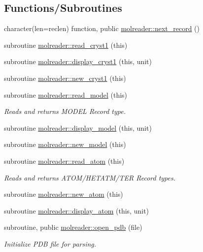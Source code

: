 \subsection*{Functions/\+Subroutines}
\begin{DoxyCompactItemize}
\item 
character(len=reclen) function, public \hyperlink{namespacemolreader_af6c857ef51f99971a66b1c293d24906b}{molreader\+::next\+\_\+record} ()
\item 
subroutine \hyperlink{namespacemolreader_af85c1b386f0dc78ebf55e003b4f8c83a}{molreader\+::read\+\_\+cryst1} (this)
\item 
subroutine \hyperlink{namespacemolreader_ac9a2b0ff287faa780311cc432b866610}{molreader\+::display\+\_\+cryst1} (this, unit)
\item 
subroutine \hyperlink{namespacemolreader_ac284dc33f40874d6156c1cd36781002c}{molreader\+::new\+\_\+cryst1} (this)
\item 
subroutine \hyperlink{namespacemolreader_a64ff990dc05c01debc1138dd012f4bcb}{molreader\+::read\+\_\+model} (this)
\begin{DoxyCompactList}\small\item\em Reads and returns M\+O\+D\+EL Record type. \end{DoxyCompactList}\item 
subroutine \hyperlink{namespacemolreader_a462d061944b74f7145b8bf89fc3439fc}{molreader\+::display\+\_\+model} (this, unit)
\item 
subroutine \hyperlink{namespacemolreader_a8edb660b2e1b64a5d78593c734afbe95}{molreader\+::new\+\_\+model} (this)
\item 
subroutine \hyperlink{namespacemolreader_a49ccaf345b633e27f69ad7a5a8637a2a}{molreader\+::read\+\_\+atom} (this)
\begin{DoxyCompactList}\small\item\em Reads and returns A\+T\+O\+M/\+H\+E\+T\+A\+T\+M/\+T\+ER Record types. \end{DoxyCompactList}\item 
subroutine \hyperlink{namespacemolreader_ae1000e1ea4e46f858a3640c08563c3ff}{molreader\+::new\+\_\+atom} (this)
\item 
subroutine \hyperlink{namespacemolreader_adb757da4ec2256578422254dad5b262e}{molreader\+::display\+\_\+atom} (this, unit)
\item 
subroutine, public \hyperlink{namespacemolreader_a38a3903d901bc5e0b318bcc0dfd1b3ff}{molreader\+::open\+\_\+pdb} (file)
\begin{DoxyCompactList}\small\item\em Initialize P\+DB file for parsing. \end{DoxyCompactList}\item 

\end{DoxyCompactItemize}
